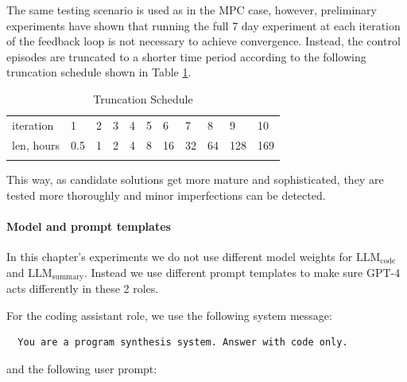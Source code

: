 The same testing scenario is used as in the MPC case, however, preliminary experiments have shown that running the full 7 day experiment at each iteration of the feedback loop is not necessary to achieve convergence. Instead, the control episodes are truncated to a shorter time period according to the following truncation schedule shown in Table \ref{tab:truncation-schedule}.

\begin{table}
\centering
\caption{Truncation Schedule}
\label{tab:truncation-schedule}       %
\begin{tabular}{lllllllllll}
\hline\noalign{\smallskip}
iteration & 1 & 2 & 3 & 4 & 5 & 6 & 7 & 8 & 9 & 10 \\
\noalign{\smallskip}\hline\noalign{\smallskip}
len, hours & 0.5 & 1 & 2 & 4 & 8 & 16 & 32 & 64 & 128 & 169 \\
\noalign{\smallskip}\hline
\end{tabular}
\end{table}

This way, as candidate solutions get more mature and sophisticated, they are tested more thoroughly and minor imperfections can be detected.

\paragraph{Model and prompt templates} In this  chapter’s experiments we do not use different model weights for $\text{LLM}_\text{code}$ and $\text{LLM}_\text{summary}$.
Instead we use different prompt templates to make sure GPT-4 acts differently in these 2 roles.

For the coding assistant role, we use the following system message:

\begin{lstlisting}
  You are a program synthesis system. Answer with code only.
\end{lstlisting}

and the following user prompt:

